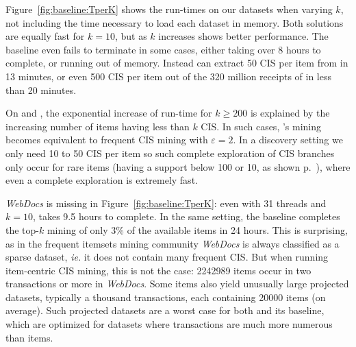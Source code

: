 Figure~\ref{fig:baseline:TperK} shows the run-times on our datasets when varying $k$,
not including the time necessary to load each dataset in memory.
Both solutions are equally fast for $k=10$, but as $k$ increases \toppi shows better performance.
The baseline even fails to terminate in some cases, either taking over 8 hours to complete, or running out of memory.
Instead \toppi can extract 50 CIS per item from \prodassocclient in 13 minutes,
or even 500 CIS per item out of the 320 million receipts of \prodassocreceipt in less than 20 minutes.

On \prodassocreceipt and \prodassocclient, the exponential increase of run-time
for $k \geq 200$ is explained by the increasing number of items having less than $k$ CIS.
In such cases, \toppi's mining becomes equivalent to frequent CIS mining with $\varepsilon = 2$.
In a discovery setting we only need 10 to 50 CIS per item so such complete exploration
of CIS branches only occur for rare items (having a support below 100 or 10, as shown p.~\pageref{fig:topKsize}),
where even a complete exploration is extremely fast.

{\em WebDocs} is missing in Figure~\ref{fig:baseline:TperK}:
even with 31 threads and $k=10$, \toppi takes 9.5 hours to complete.
In the same setting, the baseline completes the top-$k$ mining of only 3\% of the available items in 24 hours.
This is surprising, as in the frequent itemsets mining community {\em WebDocs} is always
classified as a sparse dataset, {\em ie.} it does not contain many frequent CIS.
But when running item-centric CIS mining, this is not the case:
\num{2242989} items occur in two transactions or more in {\em WebDocs}.
Some items also yield unusually large projected datasets,
typically a thousand transactions, each containing \num{20000} items (on average).
Such projected datasets are a worst case for both \toppi and its baseline,
which are optimized for datasets where transactions are much more numerous than items.


